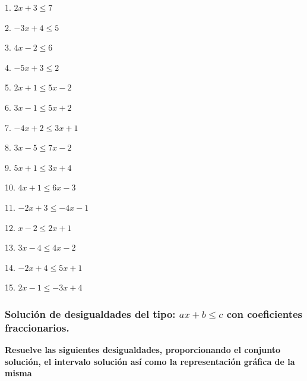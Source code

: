 \documentclass[12pt]{article}
\begin{document}
\begin{multicols}{2}
1. $2x + 3 \leq 7$

2. $-3x + 4 \leq 5$

3. $4x - 2 \leq 6$

4. $-5x + 3 \leq 2$

5. $2x + 1 \leq 5x - 2$

6. $3x - 1 \leq 5x + 2$

7. $-4x + 2 \leq 3x + 1$

8. $3x - 5 \leq 7x - 2$

9. $5x + 1 \leq 3x + 4$

10. $4x + 1 \leq 6x - 3$

11. $-2x + 3 \leq -4x - 1$

12. $x - 2 \leq 2x + 1$

13. $3x - 4 \leq 4x - 2$

14. $-2x + 4 \leq 5x + 1$

15. $2x - 1 \leq -3x + 4$
\end{multicols}

\subsubsection{\texorpdfstring{Solución de desigualdades del tipo:
\(ax+b \leq c\) con coeficientes
fraccionarios.}{Solución de desigualdades del tipo: ax+b \textbackslash leq c con coeficientes fraccionarios.}}\label{soluciuxf3n-de-desigualdades-del-tipo-axb-leq-c-con-coeficientes-fraccionarios.}
\textbf{Resuelve las siguientes desigualdades, proporcionando el
conjunto solución, el intervalo solución así como la representación
gráfica de la misma}
\end{document}
